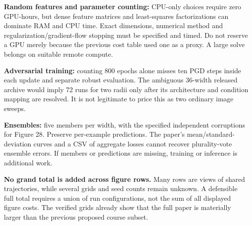 \documentclass{article}
\begin{document}
\textbf{Random features and parameter counting:} CPU-only choices require
zero GPU-hours, but dense feature matrices and least-squares factorizations
can dominate RAM and CPU time. Exact dimensions, numerical method and
regularization/gradient-flow stopping must be specified and timed. Do not
reserve a GPU merely because the previous cost table used one as a proxy.
A large solve belongs on suitable remote compute.

\textbf{Adversarial training:} counting 800 epochs alone misses ten PGD
steps inside each update and separate robust evaluation. The ambiguous
36-width released archive would imply 72 runs for two radii only after its
architecture and condition mapping are resolved. It is not legitimate to
price this as two ordinary image sweeps.

\textbf{Ensembles:} five members per width, with the specified independent
corruptions for Figure 28. Preserve per-example predictions. The paper's
mean/standard-deviation curves and a CSV of aggregate losses cannot recover
plurality-vote ensemble errors. If members or predictions are missing,
training or inference is additional work.

\textbf{No grand total is added across figure rows.} Many rows are views of
shared trajectories, while several grids and seed counts remain unknown.
A defensible full total requires a union of run configurations, not the
sum of all displayed figure costs. The verified grids already show that the
full paper is materially larger than the previous proposed course subset.
\end{document}
